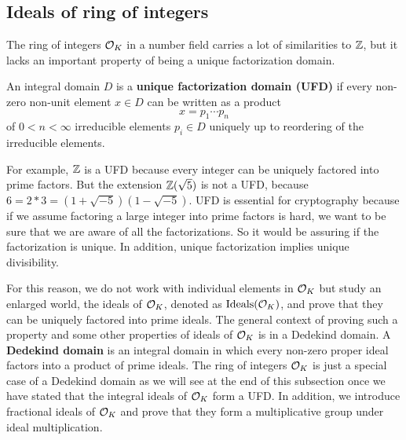 \documentclass[../main.tex]{subfiles}
\begin{document}
\subsection{Ideals of ring of integers}
	
The ring of integers $\mathcal{O}_K$ in a number field carries a lot of similarities to $\mathbb{Z}$, but it lacks an important property of being a unique factorization domain.


\begin{definition}
An integral domain $D$ is a 
\reversemarginpar
{}
\textbf{unique factorization domain (UFD)} if every non-zero non-unit element $x \in D$ can be written as a product 
\begin{equation*}
    x= p_1 \cdots p_n
\end{equation*}
of $0<n<\infty$ irreducible elements $p_i \in D$ uniquely up to reordering of the irreducible elements.
\end{definition}

For example, $\mathbb{Z}$ is a UFD because every integer can be uniquely factored into prime factors. But the extension $\mathbb{Z}(\sqrt{5})$ is not a UFD, because $6=2 * 3 = (1+\sqrt{-5})(1-\sqrt{-5})$. UFD is essential for cryptography because if we assume factoring a large integer into prime factors is hard, we want to be sure that we are aware of all the factorizations. So it would be assuring if the factorization is unique. In addition, unique factorization implies unique divisibility.

For this reason, we do not work with individual elements in $\mathcal{O}_K$ but study an enlarged world, the ideals of $\mathcal{O}_K$, denoted as $\text{Ideals}(\mathcal{O}_K)$, and prove that they can be uniquely factored into prime ideals. The general context of proving such a property and some other properties of ideals of $\mathcal{O}_K$ is in a Dedekind domain. 
\reversemarginpar
{}
A \textbf{Dedekind domain} is an integral domain in which every non-zero proper ideal factors into a product of prime ideals. The ring of integers $\mathcal{O}_K$ is just a special case of a Dedekind domain as we will see at the end of this subsection once we have stated that the integral ideals of $\mathcal{O}_K$ form a UFD. In addition, we introduce fractional ideals of $\mathcal{O}_K$ and prove that they form a multiplicative group under ideal multiplication. %
	
	
\end{document}
